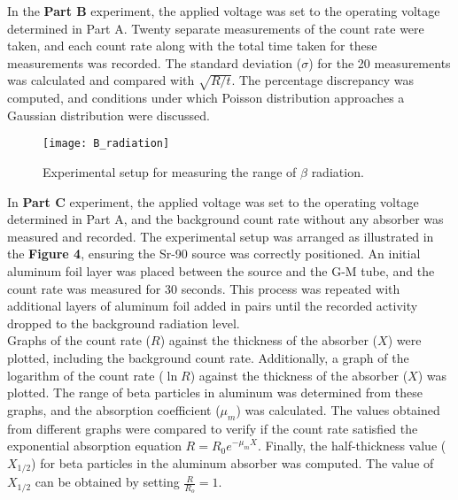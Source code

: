 \documentclass[a4paper,11pt]{article}
\begin{document}
In the \textbf{Part B} experiment, the applied voltage was set to the operating voltage determined in Part A. Twenty separate measurements of the count rate were taken, and each count rate along with the total time taken for these measurements was recorded. The standard deviation (\(\sigma\)) for the 20 measurements was calculated and compared with \(\sqrt{R/t}\). The percentage discrepancy was computed, and conditions under which Poisson distribution approaches a Gaussian distribution were discussed.

\begin{figure}[h]
    \centering
    \texttt{[image: B\_radiation]}
    \caption{Experimental setup for measuring the range of $\beta$ radiation.}
    \label{fig:gm_characteristic}
\end{figure}

In \textbf{Part C} experiment, the applied voltage was set to the operating voltage determined in Part A, and the background count rate without any absorber was measured and recorded. The experimental setup was arranged as illustrated in the \textbf{Figure 4}, ensuring the Sr-90 source was correctly positioned. An initial aluminum foil layer was placed between the source and the G-M tube, and the count rate was measured for 30 seconds. This process was repeated with additional layers of aluminum foil added in pairs until the recorded activity dropped to the background radiation level.\\

Graphs of the count rate (\(R\)) against the thickness of the absorber (\(X\)) were plotted, including the background count rate. Additionally, a graph of the logarithm of the count rate (\(\ln R\)) against the thickness of the absorber (\(X\)) was plotted. The range of beta particles in aluminum was determined from these graphs, and the absorption coefficient (\(\mu_m\)) was calculated. The values obtained from different graphs were compared to verify if the count rate satisfied the exponential absorption equation \( R = R_0 e^{-\mu_m X} \). Finally, the half-thickness value (\(X_{1/2}\)) for beta particles in the aluminum absorber was computed. The value of \(X_{1/2}\) can be obtained by setting $\frac{R}{R_o}=1$.

\newpage
{}
\end{document}
